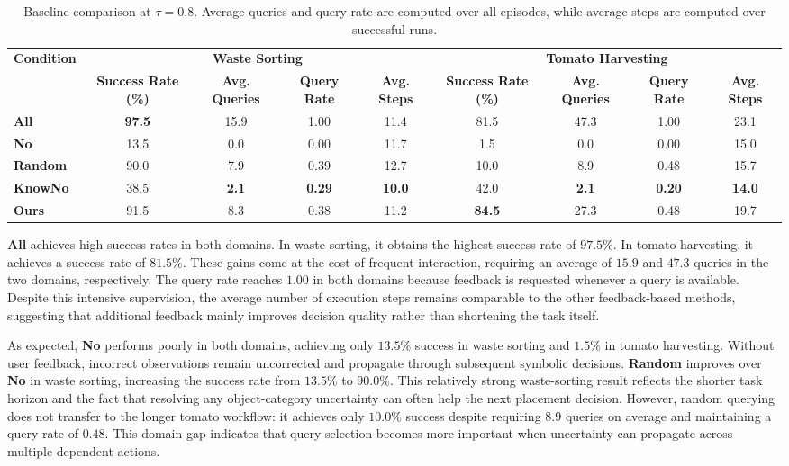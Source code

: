\begin{table}[t]
\centering
\caption{Baseline comparison at $\tau=0.8$. Average queries and query rate are computed over all episodes, while average steps are computed over successful runs.}
\label{tab:system_eval}
\footnotesize
\setlength{\tabcolsep}{2pt}
\begin{tabular*}{\textwidth}{@{\extracolsep{\fill}}lcccccccc}
\toprule
\multirow{2}{*}{\textbf{Condition}} & \multicolumn{4}{c}{\textbf{Waste Sorting}} & \multicolumn{4}{c}{\textbf{Tomato Harvesting}} \\
\cmidrule(lr){2-5}\cmidrule(lr){6-9}
& \textbf{Success Rate (\%)} & \textbf{Avg. Queries} & \textbf{Query Rate} & \textbf{Avg. Steps} & \textbf{Success Rate (\%)} & \textbf{Avg. Queries} & \textbf{Query Rate} & \textbf{Avg. Steps} \\
\midrule
\textbf{All}    & \textbf{97.5} & 15.9 & 1.00 & 11.4 & 81.5 & 47.3 & 1.00 & 23.1 \\
\textbf{No}     & 13.5 & 0.0  & 0.00 & 11.7 & 1.5  & 0.0  & 0.00 & 15.0 \\
\textbf{Random} & 90.0 & 7.9  & 0.39 & 12.7 & 10.0 & 8.9 & 0.48 & 15.7 \\
\textbf{KnowNo} & 38.5 & \textbf{2.1}  & \textbf{0.29} & \textbf{10.0} & 42.0 & \textbf{2.1}  & \textbf{0.20} & \textbf{14.0} \\
\textbf{Ours}   & 91.5 & 8.3  & 0.38 & 11.2 & \textbf{84.5} & 27.3 & 0.48 & 19.7 \\
\bottomrule
\end{tabular*}
\end{table}


\textbf{All} achieves high success rates in both domains. In waste sorting, it obtains the highest success rate of $97.5\%$. In tomato harvesting, it achieves a success rate of $81.5\%$. These gains come at the cost of frequent interaction, requiring an average of $15.9$ and $47.3$ queries in the two domains, respectively. The query rate reaches $1.00$ in both domains because feedback is requested whenever a query is available. Despite this intensive supervision, the average number of execution steps remains comparable to the other feedback-based methods, suggesting that additional feedback mainly improves decision quality rather than shortening the task itself.

As expected, \textbf{No} performs poorly in both domains, achieving only $13.5\%$ success in waste sorting and $1.5\%$ in tomato harvesting. Without user feedback, incorrect observations remain uncorrected and propagate through subsequent symbolic decisions. \textbf{Random} improves over \textbf{No} in waste sorting, increasing the success rate from $13.5\%$ to $90.0\%$. This relatively strong waste-sorting result reflects the shorter task horizon and the fact that resolving any object-category uncertainty can often help the next placement decision. However, random querying does not transfer to the longer tomato workflow: it achieves only $10.0\%$ success despite requiring $8.9$ queries on average and maintaining a query rate of $0.48$. This domain gap indicates that query selection becomes more important when uncertainty can propagate across multiple dependent actions.

